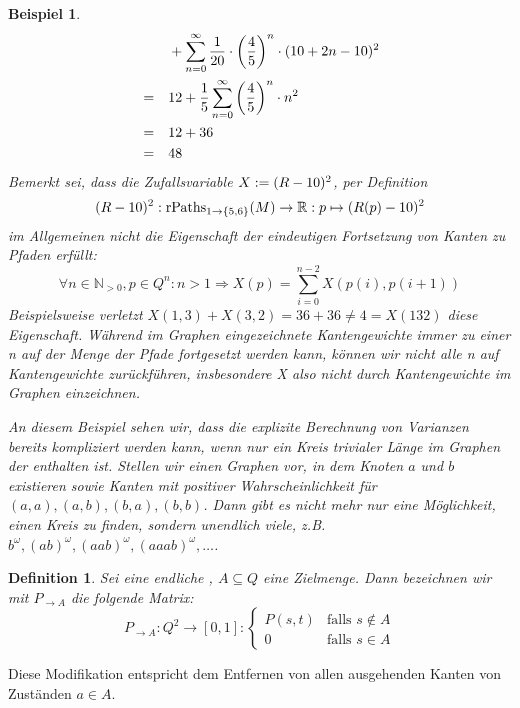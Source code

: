 \documentclass[a4paper]{article}
\newtheorem{beispiel}[satz]{Beispiel}
\newtheorem{definition}[satz]{Definition} %
\theoremstyle{nonumberplain}
\begin{document}
\begin{beispiel}
\begin{align*}
		& & & + \sum_{n = 0}^{\infty}{\frac{1}{20}\cdot\left(\frac{4}{5}\right)^n \cdot (10 + 2n - 10)^2} \\
		& = & & 12 + \frac{1}{5}\sum_{n = 0}^{\infty}{\left(\frac{4}{5}\right)^n \cdot n^2} \\
		& = & & 12 + 36 \\
		& = & & 48
	\end{align*}
	Bemerkt sei, dass die Zufallsvariable $X := (R-10)^2$, per Definition
	\[
	(R-10)^2 : \mathrm{rPaths}_{1 \rightarrow \{5,6\}}(M) \to  \mathbb{R} : p \mapsto (R(p) - 10)^2
	\]
	im Allgemeinen nicht die Eigenschaft der eindeutigen Fortsetzung von Kanten zu Pfaden erfüllt:
	\[
	\forall n \in \mathbb{N}_{>0}, p \in Q^n : n>1 \Rightarrow X(p) = \sum_{i=0}^{n-2}{X(p(i),p(i+1))}
	\]
	Beispielsweise verletzt $X(1,3) + X(3,2) = 36 + 36 \neq 4 = X(132)$ diese Eigenschaft. Während im Graphen eingezeichnete Kantengewichte immer zu einer \rvar{}n auf der Menge der Pfade fortgesetzt werden kann, können wir nicht alle \rvar{}n auf Kantengewichte zurückführen, insbesondere X also nicht durch Kantengewichte im Graphen einzeichnen.
	
	
	An diesem Beispiel sehen wir, dass die explizite Berechnung von Varianzen bereits kompliziert werden kann, wenn nur ein Kreis trivialer Länge im Graphen der \mc{} enthalten ist. Stellen wir einen Graphen vor, in dem Knoten $a$ und $b$ existieren sowie Kanten mit positiver Wahrscheinlichkeit für $(a,a), (a,b), (b,a), (b,b)$. Dann gibt es nicht mehr nur eine Möglichkeit, einen Kreis zu finden, sondern unendlich viele, z.B. $b^\omega, (ab)^\omega, (aab)^\omega, (aaab)^\omega, \dots$\;.
\end{beispiel}

\begin{definition}\label{def-pmod}
	Sei \mcex{} eine endliche \mc, $A\subseteq Q$ eine Zielmenge. Dann bezeichnen wir mit $P_{\rightarrow A}$ die folgende Matrix:
	\begin{equation}
	P_{\rightarrow A} : Q^2 \to [0,1] : \begin{cases}
	P(s,t) & \text{falls } s\notin A\\
	0 & \text{falls } s\in A
	\end{cases}
	\end{equation}
\end{definition}

Diese Modifikation entspricht dem Entfernen von allen ausgehenden Kanten von Zuständen $a\in A$.
\end{document}
